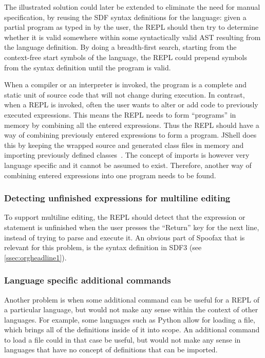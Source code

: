 The illustrated solution could later be extended to eliminate the need for
manual specification, by reusing the SDF syntax definitions for the language:
given a partial program as typed in by the user, the REPL should then try to
determine whether it is valid somewhere within some syntactically valid AST
resulting from the language definition. By doing a breadth-first search,
starting from the context-free start symbols of the language, the REPL could
prepend symbols from the syntax definition until the program is valid.

When a compiler or an interpreter is invoked, the program is a complete and
static unit of source code that will not change during execution. In contrast,
when a REPL is invoked, often the user wants to alter or add code to previously
executed expressions. This means the REPL needs to form ``programs'' in memory
by combining all the entered expressions.  Thus the REPL should have a way of
combining previously entered expressions to form a program. JShell does this by
keeping the wrapped source and generated class files in memory and importing
previously defined classes~\cite{jshell-repl}. The concept of imports is
however very language specific and it cannot be assumed to exist.  Therefore,
another way of combining entered expressions into one program needs to be
found.

\subsubsection{Detecting unfinished expressions for multiline editing}
\label{sec:detect-unfin-expr}
To support multiline editing, the REPL should detect that the
expression or statement is unfinished when the user presses the
``Return'' key for the next line, instead of trying to parse and
execute it. An obvious part of Spoofax that is relevant for this
problem, is the syntax definition in SDF3 (see
\cref{ssec:orgheadline1}).

\subsubsection{Language specific additional commands}
\label{sec:lang-spec-addit}
Another problem is when some additional command can be useful for a
REPL of a particular language, but would not make any sense within the
context of other languages. For example, some languages such as Python
allow for loading a file, which brings all of the definitions inside
of it into scope. An additional command to load a file could in that
case be useful, but would not make any sense in languages that have no
concept of definitions that can be imported.

